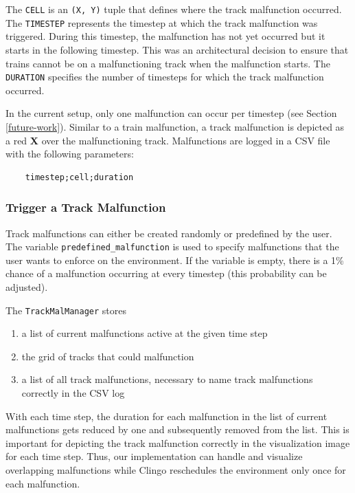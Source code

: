 \documentclass[runningheads]{llncs}
\begin{document}
The \texttt{CELL} is an \texttt{(X, Y)} tuple that defines where the track malfunction occurred.
The \texttt{TIMESTEP} represents the timestep at which the track malfunction was triggered. During this timestep, the malfunction has not yet occurred but it starts in the following timestep. This was an architectural decision to ensure that trains cannot be on a malfunctioning track when the malfunction starts. 
The \texttt{DURATION} specifies the number of timesteps for which the track malfunction occurred.

In the current setup, only one malfunction can occur per timestep (see Section \ref{future-work}). Similar to a train malfunction, a track malfunction is depicted as a red \textbf{X} over the malfunctioning track. Malfunctions are logged in a CSV file with the following parameters:

\begin{verbatim}
	timestep;cell;duration
\end{verbatim}


\subsubsection{Trigger a Track Malfunction}
Track malfunctions can either be created randomly or predefined by the user. The variable \texttt{predefined\_malfunction} is used to specify malfunctions that the user wants to enforce on the environment. If the variable is empty, there is a 1\% chance of a malfunction occurring at every timestep (this probability can be adjusted). 

The \texttt{TrackMalManager} stores 
\begin{enumerate}
	\item a list of current malfunctions active at the given time step
	\item the grid of tracks that could malfunction
	\item a list of all track malfunctions, necessary to name track malfunctions correctly in the CSV log
\end{enumerate}

With each time step, the duration for each malfunction in the list of current malfunctions gets reduced by one and subsequently removed from the list. This is important for depicting the track malfunction correctly in the visualization image for each time step. Thus, our implementation can handle and visualize overlapping malfunctions while Clingo reschedules the environment only once for each malfunction.
\end{document}
